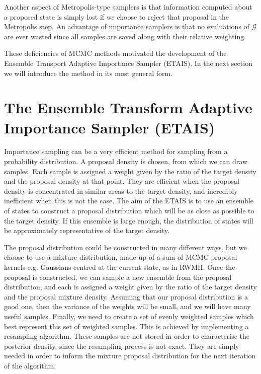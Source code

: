 \documentclass[final]{siamltex}
\begin{document}
Another aspect of Metropolis-type samplers is that information
computed about a proposed state is simply lost if we choose to reject
that proposal in the Metropolis step. An advantage of importance
samplers is that no evaluations of $\mathcal{G}$ are ever wasted
since all samples are saved along with their relative weighting.

{\red These deficiencies of MCMC methods
motivated the development of the Ensemble Transport Adaptive Importance Sampler
(ETAIS).}
In the next section we will introduce the method in its most
general form.


\section{The Ensemble Transform Adaptive Importance Sampler \allowbreak (ETAIS)}\label{Sec:ETAIS}

Importance sampling can be a very efficient method for sampling from a
probability distribution. A proposal density is chosen, from which we
can draw samples. Each sample is assigned a weight given by the
ratio of the target density and the proposal density at that
point. They are efficient when the proposal density is concentrated in
similar areas to the target density, and incredibly inefficient when
this is not the case. The aim of the ETAIS is to use an ensemble of states to construct a proposal
distribution which will be as close as possible to the target density. If this
ensemble is large enough, the distribution of states will be
approximately representative
of the target density.

The proposal distribution could be constructed in many different ways,
but we choose to use a mixture distribution, made up of a sum of MCMC
proposal kernels  e.g. Gaussians centred at the current state, as in RWMH. Once the proposal is constructed, we can
sample a new ensemble from the proposal distribution, and each is
assigned a weight given by the ratio of the target density and the
proposal mixture density. Assuming that our proposal distribution is a
good one, then the variance of the weights will be small, and we will
have many useful samples. Finally, we need to create a set of evenly
weighted samples which best represent this set of weighted samples.
This is achieved by implementing a resampling algorithm. These samples
are not stored in order to characterise the posterior density, since
the resampling process {\red is not exact}. They are
simply needed in order to inform the mixture proposal distribution for the next
iteration of the algorithm. 
\end{document}
